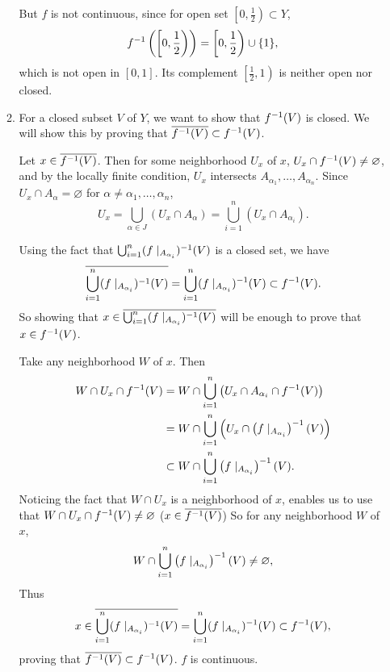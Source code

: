 \documentclass[12pt]{report}
\newcommand{\subprob}[1]{\item[\textbf{\sffamily (#1)}]}
\begin{document}
\begin{enumerate}
\begin{enumerate}
        \bigskip

        But \(f\) is not continuous, since for open set \(\left[0, \frac{1}{2}\right) \subset Y\),
        \[
            f^{-1}\left( \left[0, \frac{1}{2}\right) \right) = \left[0, \frac{1}{2}\right) \cup \{1\},
        \]
        which is not open in \([0, 1]\). Its complement \(\left[\frac{1}{2}, 1\right)\) is neither open nor closed.

        \subprob{c} For a closed subset \(V\) of \(Y\), we want to show that \(f^{-1}(V)\) is closed. We will show this by proving that \(\overline{f^{-1}(V)} \subset f^{-1}(V)\).

        Let \(x \in \overline{f^{-1}(V)}\). Then for some neighborhood \(U_x\) of \(x\), \(U_x \cap f^{-1}(V) \neq \varnothing\), and by the locally finite condition, \(U_x\) intersects \(A_{\alpha_1}, \dots, A_{\alpha_n}\). Since \(U_x \cap A_\alpha = \varnothing\) for \(\alpha \neq \alpha_1, \dots, \alpha_n\),
        \[
            U_x = \bigcup_{\alpha \in J} (U_x\cap A_\alpha) = \bigcup_{i=1}^n (U_x \cap A_{\alpha_i}).
        \]

        Using the fact that \(\bigcup_{i=1}^n (f \mid_{A_{\alpha_i}})^{-1}(V)\) is a closed set, we have
        \[
            \overline{\bigcup_{i=1}^n (f \mid_{A_{\alpha_i}})^{-1}(V)} = \bigcup_{i=1}^n (f \mid_{A_{\alpha_i}})^{-1}(V) \subset f^{-1}(V).
        \]
        So showing that \(x \in \overline{\bigcup_{i=1}^n (f \mid_{A_{\alpha_i}})^{-1}(V)}\) will be enough to prove that \(x \in f^{-1}(V)\).

        \bigskip

        Take any neighborhood \(W\) of \(x\). Then
        \[
            \begin{aligned}
                W \cap U_x \cap f^{-1}(V) & = W \cap \bigcup_{i=1}^n \left( U_x \cap A_{\alpha_i} \cap f^{-1}(V) \right)          \\
                                         & = W \cap \bigcup_{i=1}^n \left( U_x \cap \left( f\mid_{A_{\alpha_i}} \right)^{-1}(V) \right) \\
                                         & \subset W \cap \bigcup_{i=1}^n \left( f \mid_{A_{\alpha_i}} \right)^{-1}(V).
            \end{aligned}
        \]
        Noticing the fact that \(W \cap U_x\) is a neighborhood of \(x\), enables us to use that \(W \cap U_x \cap f^{-1}(V) \neq \varnothing\) (\(x \in \overline{f^{-1}(V)}\)) So for any neighborhood \(W\) of \(x\),
        \[
            W \cap \bigcup_{i=1}^n \left( f \mid_{A_{\alpha_i}} \right)^{-1}(V) \neq \varnothing,
        \]
        Thus
        \[
            \begin{aligned}
                x \in \overline{\bigcup_{i=1}^n (f \mid_{A_{\alpha_i}})^{-1}(V)} = \bigcup_{i=1}^n (f \mid_{A_{\alpha_i}})^{-1}(V) \subset f^{-1}(V),
            \end{aligned}
        \]
        proving that \(\overline{f^{-1}(V)} \subset f^{-1}(V)\). \(f\) is continuous.
    \end{enumerate}


\end{enumerate}
\end{document}

